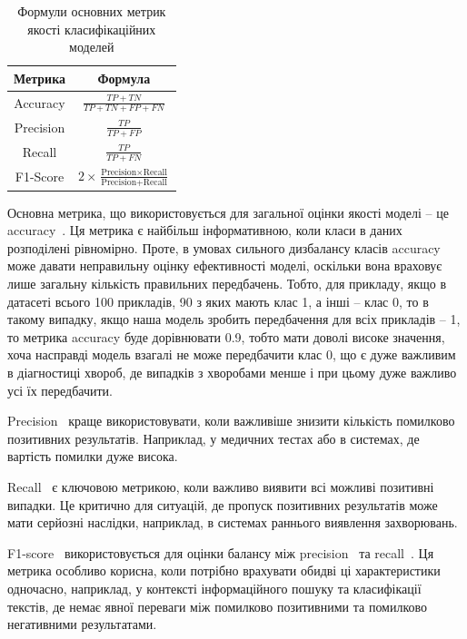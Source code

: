 \begin{table}[ht]
	\setfontsize{14pt}
	\caption{Формули основних метрик якості класифікаційних моделей}
	\label{tab_metrics}
	\centering
	\begin{tabular}{|c|c|}
		\hline
		Метрика & Формула \\
		\hline
		Accuracy & $\frac{TP + TN}{TP + TN + FP + FN}$ \\
		\hline
		Precision & $\frac{TP}{TP + FP}$ \\
		\hline
		Recall & $\frac{TP}{TP + FN}$ \\
		\hline
		F1-Score & $2 \times \frac{\text{Precision} \times \text{Recall}}{\text{Precision} + \text{Recall}}$ \\
		\hline
	\end{tabular}
\end{table}

Основна метрика, що використовується для загальної оцінки якості моделі -- це accuracy~\cite{ct6}. Ця метрика є найбільш інформативною, коли класи в даних розподілені рівномірно. Проте, в умовах сильного дизбалансу класів accuracy~\cite{ct6} може давати неправильну оцінку ефективності моделі, оскільки вона враховує лише загальну кількість правильних передбачень. Тобто, для прикладу, якщо в датасеті всього 100 прикладів, 90 з яких мають клас 1, а інші -- клас 0, то в такому випадку, якщо наша модель зробить передбачення для всіх прикладів -- 1, то метрика accuracy буде дорівнювати 0.9, тобто мати доволі високе значення, хоча насправді модель взагалі не може передбачити клас 0, що є дуже важливим в діагностиці хвороб, де випадків з хворобами менше і при цьому дуже важливо усі їх передбачити.

Precision~\cite{ct6} краще використовувати, коли важливіше знизити кількість помилково позитивних результатів. Наприклад, у медичних тестах або в системах, де вартість помилки дуже висока.

Recall~\cite{ct7} є ключовою метрикою, коли важливо виявити всі можливі позитивні випадки. Це критично для ситуацій, де пропуск позитивних результатів може мати серйозні наслідки, наприклад, в системах раннього виявлення захворювань.

F1-score~\cite{ct8} використовується для оцінки балансу між precision~\cite{ct6} та recall~\cite{ct7}. Ця метрика особливо корисна, коли потрібно врахувати обидві ці характеристики одночасно, наприклад, у контексті інформаційного пошуку та класифікації текстів, де немає явної переваги між помилково позитивними та помилково негативними результатами.

